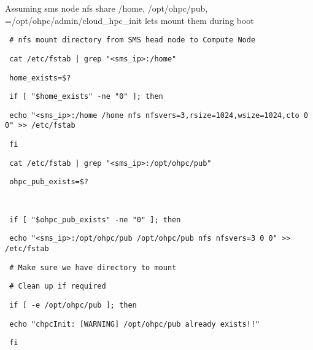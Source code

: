 \documentclass[12pt]{article}
\begin{document}
Assuming sms node nfs share /home, /opt/ohpc/pub, =/opt/ohpc/admin/cloud\_hpc\_init lets mount them during boot

\begin{bash}\texttt{\small{ \# nfs mount directory from SMS head node to Compute Node}}\end{bash}
\begin{bash}\texttt{\small{ cat /etc/fstab | grep "<sms\_ip>:/home"}}\end{bash}
\begin{bash}\texttt{\small{ home\_exists=\$?}}\end{bash}
\begin{bash}\texttt{\small{ if [ "\${home\_exists}" -ne "0" ]; then}}\end{bash}
\begin{bash}\texttt{\small{     echo "<sms\_ip>:/home /home nfs nfsvers=3,rsize=1024,wsize=1024,cto 0 0" >> /etc/fstab}}\end{bash}
\begin{bash}\texttt{\small{ fi}}\end{bash}
\begin{bash}\texttt{\small{ cat /etc/fstab | grep "<sms\_ip>:/opt/ohpc/pub"}}\end{bash}
\begin{bash}\texttt{\small{ ohpc\_pub\_exists=\$?}}\end{bash}
\begin{bash}\texttt{\small{ }}\end{bash}
\begin{bash}\texttt{\small{ if [ "\${ohpc\_pub\_exists}" -ne "0" ]; then}}\end{bash}
\begin{bash}\texttt{\small{     echo "<sms\_ip>:/opt/ohpc/pub /opt/ohpc/pub nfs nfsvers=3 0 0" >> /etc/fstab}}\end{bash}
\begin{bash}\texttt{\small{     \# Make sure we have directory to mount}}\end{bash}
\begin{bash}\texttt{\small{     \# Clean up if required}}\end{bash}
\begin{bash}\texttt{\small{     if [ -e /opt/ohpc/pub ]; then}}\end{bash}
\begin{bash}\texttt{\small{         echo "chpcInit: [WARNING] /opt/ohpc/pub already exists!!"}}\end{bash}
\begin{bash}\texttt{\small{     fi}}\end{bash}
\end{document}
